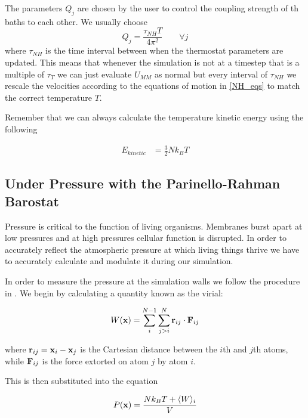 The parameters $Q_j$ are chosen by the user to control the coupling strength of th baths to each other. We usually choose   
\begin{equation}
	Q_j = \frac{\tau_{NH}T}{4\pi^2}\qquad  \forall j
\end{equation}
where $\tau_{NH}$ is the time interval between when the thermostat parameters are updated. This means that whenever the simulation is not at a timestep that is a multiple of $\tau_T$  we can just evaluate $U_{MM}$ as normal but every interval of $\tau_{NH}$ we rescale the velocities according to the equations of motion in \ref{NH_eqs} to match the correct temperature $T$.

Remember that we can always calculate the temperature  kinetic energy using the following

\begin{equation}
	\begin{aligned}
		E_{kinetic} &= \frac{3}{2}Nk_BT 
	\end{aligned}
\end{equation}
	


\subsection{Under Pressure with the Parinello-Rahman Barostat}
Pressure is critical to the function of living organisms. Membranes burst apart at low pressures\cite{karal2021} and at high pressures cellular function is disrupted\cite{macdonald2001}. In order to accurately reflect the atmospheric pressure at which living things thrive we have to accurately calculate and modulate it during our simulation.

In order to measure the pressure at the simulation walls we follow the procedure in \cite{allen1991}. We begin by calculating a quantity known as the virial:

\begin{equation}
	W(\bold{x}) = \sum_i^{N-1} \sum^N_{j>i} \bold{r}_{ij} \cdot \bold{F}_{ij}
\end{equation}

where $\bold{r}_{ij} = \bold{x}_i - \bold{x}_j$  is the Cartesian distance between the $i$th and $j$th atoms, while $\bold F_{ij}$ is the force extorted on atom $j$ by atom $i$. 

This is then substituted into the equation 

\begin{equation}
	P (\bold{x}) = \frac{N k_B T + \langle W \rangle_i}{V}
	\label{instantaneous_pressure}
\end{equation}


